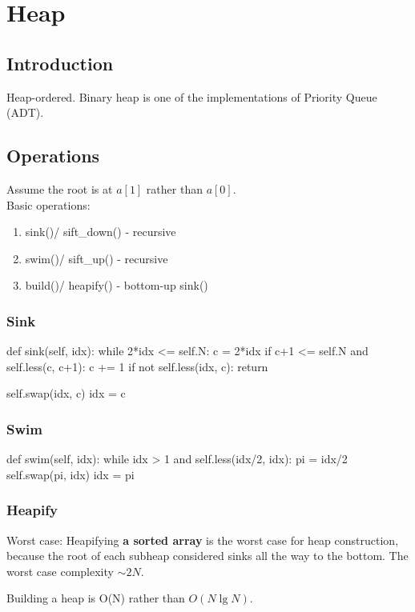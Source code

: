 \chapter{Heap}

\section{Introduction}
Heap-ordered. Binary heap is one of the implementations of Priority Queue (ADT). 

\section{Operations}
Assume the root is at $a[1]$ rather than $a[0]$.
\\
Basic operations:
\begin{enumerate}
\item sink()/ sift\_down() - recursive
\item swim()/ sift\_up() - recursive
\item build()/ heapify() - bottom-up sink()
\end{enumerate}
\subsection{Sink}
\begin{python}
def sink(self, idx):
    while 2*idx <= self.N:
        c = 2*idx
        if c+1 <= self.N and self.less(c, c+1):
            c += 1
        if not self.less(idx, c):
            return 

        self.swap(idx, c)
        idx = c
\end{python}
\subsection{Swim}
\begin{python}
def swim(self, idx):
    while idx > 1 and self.less(idx/2, idx):
        pi = idx/2
        self.swap(pi, idx)
        idx = pi
\end{python}
\subsection{Heapify}
Worst case: Heapifying \textbf{a sorted array} is the worst case for heap construction, because the root of each subheap considered sinks all the way to the bottom. The worst case complexity $\sim 2N$.

Building a heap is O(N) rather than $O(N \lg N)$.

